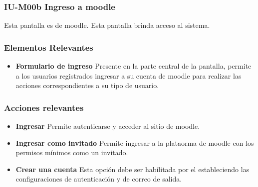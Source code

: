 
\subsubsection{IU-M00b Ingreso a moodle}

    Esta pantalla es de moodle. Esta pantalla brinda acceso al sistema.


\subsubsection{Elementos Relevantes}

    \begin{itemize}
    \item {\bf Formulario de ingreso}
        Presente en la parte central de la pantalla, permite a los usuarios
        registrados ingresar a su cuenta de moodle para realizar las acciones
        correspondientes a su tipo de usuario.
    \end{itemize}

\subsubsection{Acciones relevantes}

    \begin{itemize}
    \item {\bf Ingresar}
        Permite autenticarse y acceder al sitio de moodle.

    \item {\bf Ingresar como invitado}
        Permite ingresar a la plataorma de moodle con los permisos mínimos
        como un invitado.

    \item {\bf Crear una cuenta}
        Esta opción debe ser habilitada por el 
        estableciendo las configuraciones de autenticación y de correo 
        de salida.
    \end{itemize}

\clearpage
